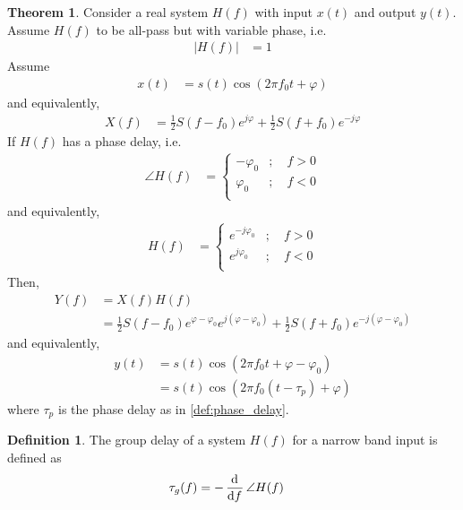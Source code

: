 \documentclass[titlepage, fleqn, a4paper, 12pt, twoside]{article}
\theoremstyle{definition}
\newtheorem{definition}{Definition}
\theoremstyle{theorem}
\newtheorem{theorem}{Theorem}
\begin{document}
\begin{theorem}
	Consider a real system $H(f)$ with input $x(t)$ and output $y(t)$.
	Assume $H(f)$ to be all-pass but with variable phase, i.e.
	\begin{align*}
		\left| H(f) \right| &= 1
	\end{align*}
	Assume
	\begin{align*}
		x(t) &= s(t) \cos\left( 2 \pi f_0 t + \varphi \right)
	\end{align*}
	and equivalently,
	\begin{align*}
		X(f) &= \frac{1}{2} S(f - f_0) e^{j \varphi} + \frac{1}{2} S(f + f_0) e^{-j \varphi}
	\end{align*}
	If $H(f)$ has a phase delay, i.e.
	\begin{align*}
		\angle H(f) &=
			\begin{cases}
				-\varphi_0 &;\quad f > 0\\
				\varphi_0 &;\quad f < 0\\
			\end{cases}
	\end{align*}
	and equivalently,
	\begin{align*}
		H(f) &=
			\begin{cases}
				e^{-j \varphi_0} &;\quad f > 0\\
				e^{j \varphi_0} &;\quad f < 0\\
			\end{cases}
	\end{align*}
	Then,
	\begin{align*}
		Y(f) &= X(f) H(f)\\
		&= \frac{1}{2} S(f - f_0) e^{\varphi - \varphi_0} e^{j (\varphi - \varphi_0)} + \frac{1}{2} S(f + f_0) e^{-j (\varphi - \varphi_0)}
	\end{align*}
	and equivalently,
	\begin{align*}
		y(t) &= s(t) \cos(2 \pi f_0 t + \varphi - \varphi_0)\\
		&= s(t) \cos\left( 2 \pi f_0 (t - \tau_p) + \varphi \right)
	\end{align*}
	where $\tau_p$ is the phase delay as in \cref{def:phase_delay}.
\end{theorem}

\begin{definition}
	The group delay of a system $H(f)$ for a narrow band input is defined as
	\begin{align*}
		\tau_g(f) &= -\dod{}{f} \angle H(f)
	\end{align*}
	\label{def:group_delay}
\end{definition}
\end{document}
